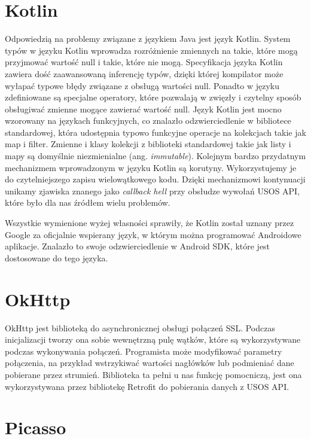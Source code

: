 \documentclass{pracamgr}
\begin{document}
\section{Kotlin}

Odpowiedzią na problemy związane z językiem Java jest język Kotlin. System typów
w języku Kotlin wprowadza rozróżnienie zmiennych na takie, które mogą przyjmować
wartość null i takie, które nie mogą. Specyfikacja języka Kotlin zawiera dość
zaawansowaną inferencję typów, dzięki której kompilator może wyłapać typowe błędy
związane z obsługą wartości null. Ponadto w języku zdefiniowane są specjalne
operatory, które pozwalają w zwięzły i czytelny sposób obsługiwać zmienne mogące
zawierać wartość null. Język Kotlin jest mocno wzorowany na językach funkcyjnych,
co znalazło odzwierciedlenie w bibliotece standardowej, która udostępnia typowo
funkcyjne operacje na kolekcjach takie jak map i filter. Zmienne i klasy
kolekcji z biblioteki standardowej takie jak listy i mapy są domyślnie niezmienialne
(ang. \textit{immutable}). Kolejnym bardzo przydatnym mechanizmem wprowadzonym w
języku Kotlin są korutyny. Wykorzystujemy je do czytelniejszego zapisu wielowątkowego
kodu. Dzięki mechanizmowi kontynuacji unikamy zjawiska znanego jako \textit{callback hell}
przy obsłudze wywołań USOS API, które było dla nas źródłem wielu problemów.

Wszystkie wymienione wyżej własności sprawiły, że Kotlin został uznany przez
Google za oficjalnie wspierany język, w którym można programować Androidowe
aplikacje. Znalazło to swoje odzwierciedlenie w Android SDK, które jest
dostosowane do tego języka.

\section{OkHttp}

OkHttp jest biblioteką do asynchronicznej obsługi połączeń SSL. Podczas inicjalizacji
tworzy ona sobie wewnętrzną pulę wątków, które są wykorzystywane podczas wykonywania
połączeń. Programista może modyfikować parametry połączenia, na przykład wstrzykiwać
wartości nagłówków lub podmieniać dane pobierane przez strumień. Biblioteka ta
pełni u nas funkcję pomocniczą, jest ona wykorzystywana przez bibliotekę Retrofit
do pobierania danych z USOS API.

\section{Picasso}
\end{document}
